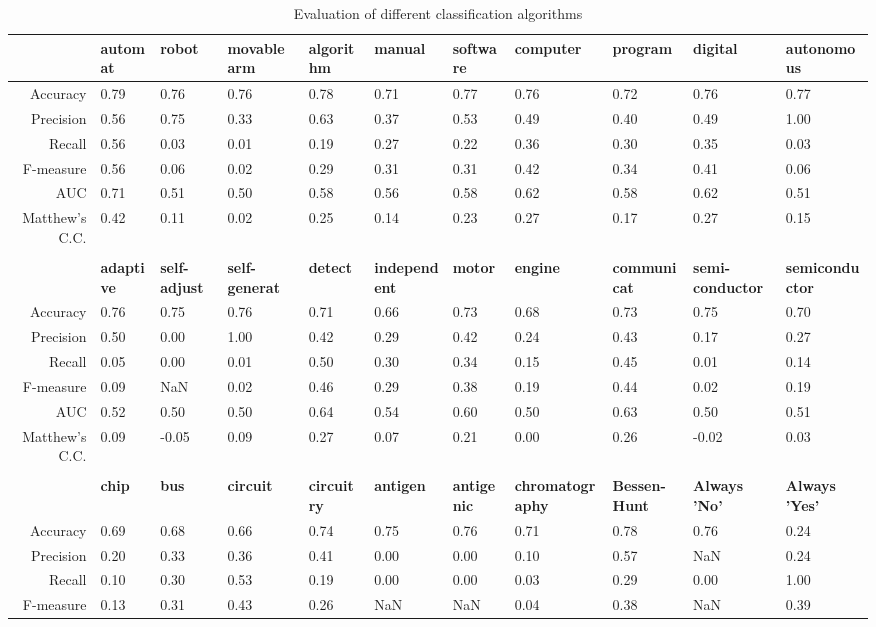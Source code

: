 \begin{table}
\begin{small}
\begin{threeparttable}
\caption{{\normalsize Evaluation of different classification algorithms}}
\label{table:table_compare_classalg}
\begin{tabular}{rllllllllll}
\toprule 
 & \textbf{automat} & \textbf{robot} & \textbf{movable arm} & \textbf{algorithm} & \textbf{manual} & \textbf{software} & \textbf{computer} & \textbf{program} & \textbf{digital} & \textbf{autonomous}  \tabularnewline 
\midrule 
Accuracy & 0.79 & 0.76 & 0.76 & 0.78 & 0.71 & 0.77 & 0.76 & 0.72 & 0.76 & 0.77  \tabularnewline 
Precision & 0.56 & 0.75 & 0.33 & 0.63 & 0.37 & 0.53 & 0.49 & 0.40 & 0.49 & 1.00  \tabularnewline 
Recall & 0.56 & 0.03 & 0.01 & 0.19 & 0.27 & 0.22 & 0.36 & 0.30 & 0.35 & 0.03  \tabularnewline 
F-measure & 0.56 & 0.06 & 0.02 & 0.29 & 0.31 & 0.31 & 0.42 & 0.34 & 0.41 & 0.06  \tabularnewline 
AUC & 0.71 & 0.51 & 0.50 & 0.58 & 0.56 & 0.58 & 0.62 & 0.58 & 0.62 & 0.51  \tabularnewline 
Matthew's C.C. & 0.42 & 0.11 & 0.02 & 0.25 & 0.14 & 0.23 & 0.27 & 0.17 & 0.27 & 0.15  \tabularnewline 
\tabularnewline 
 & \textbf{adaptive} & \textbf{self-adjust} & \textbf{self-generat} & \textbf{detect} & \textbf{independent} & \textbf{motor} & \textbf{engine} & \textbf{communicat} & \textbf{semi-conductor} & \textbf{semiconductor}  \tabularnewline 
\midrule 
Accuracy & 0.76 & 0.75 & 0.76 & 0.71 & 0.66 & 0.73 & 0.68 & 0.73 & 0.75 & 0.70  \tabularnewline 
Precision & 0.50 & 0.00 & 1.00 & 0.42 & 0.29 & 0.42 & 0.24 & 0.43 & 0.17 & 0.27  \tabularnewline 
Recall & 0.05 & 0.00 & 0.01 & 0.50 & 0.30 & 0.34 & 0.15 & 0.45 & 0.01 & 0.14  \tabularnewline 
F-measure & 0.09 & NaN & 0.02 & 0.46 & 0.29 & 0.38 & 0.19 & 0.44 & 0.02 & 0.19  \tabularnewline 
AUC & 0.52 & 0.50 & 0.50 & 0.64 & 0.54 & 0.60 & 0.50 & 0.63 & 0.50 & 0.51  \tabularnewline 
Matthew's C.C. & 0.09 & -0.05 & 0.09 & 0.27 & 0.07 & 0.21 & 0.00 & 0.26 & -0.02 & 0.03  \tabularnewline 
\tabularnewline 
 & \textbf{chip} & \textbf{bus} & \textbf{circuit} & \textbf{circuitry} & \textbf{antigen} & \textbf{antigenic} & \textbf{chromatography} & \textbf{Bessen-Hunt} & \textbf{Always 'No'} & \textbf{Always 'Yes'}  \tabularnewline 
\midrule 
Accuracy & 0.69 & 0.68 & 0.66 & 0.74 & 0.75 & 0.76 & 0.71 & 0.78 & 0.76 & 0.24  \tabularnewline 
Precision & 0.20 & 0.33 & 0.36 & 0.41 & 0.00 & 0.00 & 0.10 & 0.57 & NaN & 0.24  \tabularnewline 
Recall & 0.10 & 0.30 & 0.53 & 0.19 & 0.00 & 0.00 & 0.03 & 0.29 & 0.00 & 1.00  \tabularnewline 
F-measure & 0.13 & 0.31 & 0.43 & 0.26 & NaN & NaN & 0.04 & 0.38 & NaN & 0.39  \tabularnewline 

\end{tabular}
\end{threeparttable}
\end{small}
\end{table}
